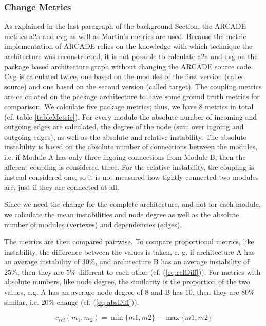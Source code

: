 \documentclass[conference]{IEEEtran}
\begin{document}
\subsubsection{Change Metrics}

As explained in the last paragraph of the background Section, the ARCADE metrics a2a and cvg as well as Martin's metrics are used. Because the metric implementation of ARCADE relies on the knowledge with which technique the architecture was reconstructed, it is not possible to calculate a2a and cvg on the package based architecture graph without changing the ARCADE source code. Cvg is calculated twice, one based on the modules of the first version (called source) and one based on the second version (called target).
The coupling metrics are calculated on the package architecture to have some ground truth metrics for comparison. We calculate five package metrics; thus, we have 8 metrics in total (cf. table \ref{tableMetric}).
For every module the absolute number of incoming and outgoing edges are calculated, the degree of the node (sum over ingoing and outgoing edges), as well as the absolute and relative instability. The absolute instability is based on the absolute number of connections between the modules, i.e. if Module A has only three ingoing connections from Module B, then the afferent coupling is considered three. For the relative instability, the coupling is instead considered one, so it is not measured how tightly connected two modules are, just if they are connected at all.

Since we need the change for the complete architecture, and not for each module, we calculate the mean instabilities and node degree as well as the absolute number of modules (vertexes) and dependencies (edges).

The metrics are then compared pairwise. To compare proportional metrics, like instability, the difference between the values is taken, e. g. if architecture A has an average instability of $30\%$, and architecture B has an average instability of $25\%$, then they are $5\%$ different to each other (cf. (\ref{eq:relDiff})). For metrics with absolute numbers, like node degree, the similarity is the proportion of the two values, e.g. A has an average node degree of $8$ and B has $10$, then they are $80\%$ similar, i.e. $20\%$ change (cf. (\ref{eq:absDiff})).

\begin{equation} \label{eq:relDiff}
c_{rel}(m_1, m_2) =  \min\{m1, m2\} - \max\{m1, m2\}
\end{equation} 
\end{document}

